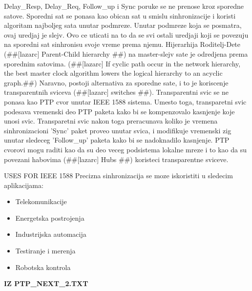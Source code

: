 \documentclass[a4paper,12pt, master]{etf}
\begin{document}
	Delay\_Resp, Delay\_Req, Follow\_up i Sync poruke se ne prenose kroz sporedne satove. 
	Sporedni sat se ponasa kao obican sat u smislu sinhronizacije i koristi algoritam 
	najboljeg sata unutar podmreze. Unutar podmreze koja se posmatra, ovaj uredjaj je slejv. 
	Ovo ce uticati na to da se svi ostali uredjaji koji se povezuju na sporedni sat 
	sinhronisu svoje vreme prema njemu. Hijerarhija Roditelj-Dete (\#\#[lazarc] Parent-Child 
	hierarchy \#\#) na master-slejv sate je odredjena prema sporednim satovima. (\#\#[lazarc] 
	If cyclic path occur in the network hierarchy, the best master clock algorithm lowers the 
	logical hierarchy to an acyclic graph.\#\#)	Naravno, postoji alternativa za sporedne sate, 
	i to je koriscenje transparentnih sviceva (\#\#[lazarc] switches \#\#). Transparentni svic 
	se ne ponasa kao PTP cvor unutar IEEE 1588 sistema. Umesto toga, transparetni svic podesava 
	vremenski deo PTP paketa kako bi se kompenzovalo kasnjenje koje unosi svic. Transparetni 
	svic nakon toga preracunava koliko je vremena sinhronizacioni 'Sync' paket proveo unutar 
	svica, i modifikuje vremenski zig unutar sledeceg 'Follow\_up' paketa kako bi se 
	nadoknadilo kasnjenje. PTP cvorovi mogu raditi kao da su deo veceg podsistema lokalne mreze
	i to kao da su povezani habovima (\#\#[lazarc] Hubs \#\#) koristeci transparentne sviceve.
	
	USES FOR IEEE 1588
	Precizna sinhronizacija se moze iskoristiti u sledecim aplikacijama:
	\begin{itemize}
		\item Telekomunikacije
		\item Energetska postrojenja
		\item Industrijska automacija
		\item Testiranje i merenja
		\item Robotska kontrola
	\end{itemize}

	\textbf{IZ PTP\_NEXT\_2.TXT}
\end{document}
